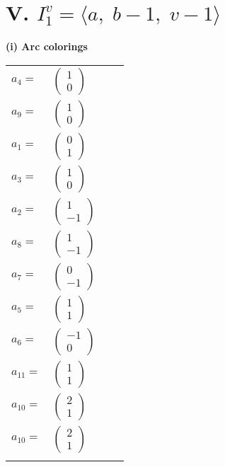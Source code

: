 \documentclass[1p]{elsarticle_modified}
\theoremstyle{definition}
\begin{document}
\centering \section*{V. $I^v_{1}= \langle a,\;b-1,\;v-1 \rangle$}
\flushleft \textbf{(i) Arc colorings}\\
\begin{tabular}{m{7pt} m{180pt} m{7pt} m{180pt} }
\flushright $a_{4}=$&$\begin{pmatrix}1\\0\end{pmatrix}$ \\
\flushright $a_{9}=$&$\begin{pmatrix}1\\0\end{pmatrix}$ \\
\flushright $a_{1}=$&$\begin{pmatrix}0\\1\end{pmatrix}$ \\
\flushright $a_{3}=$&$\begin{pmatrix}1\\0\end{pmatrix}$ \\
\flushright $a_{2}=$&$\begin{pmatrix}1\\-1\end{pmatrix}$ \\
\flushright $a_{8}=$&$\begin{pmatrix}1\\-1\end{pmatrix}$ \\
\flushright $a_{7}=$&$\begin{pmatrix}0\\-1\end{pmatrix}$ \\
\flushright $a_{5}=$&$\begin{pmatrix}1\\1\end{pmatrix}$ \\
\flushright $a_{6}=$&$\begin{pmatrix}-1\\0\end{pmatrix}$ \\
\flushright $a_{11}=$&$\begin{pmatrix}1\\1\end{pmatrix}$ \\
\flushright $a_{10}=$&$\begin{pmatrix}2\\1\end{pmatrix}$\\ \flushright $a_{10}=$&$\begin{pmatrix}2\\1\end{pmatrix}$\\&\end{tabular}
\end{document}
